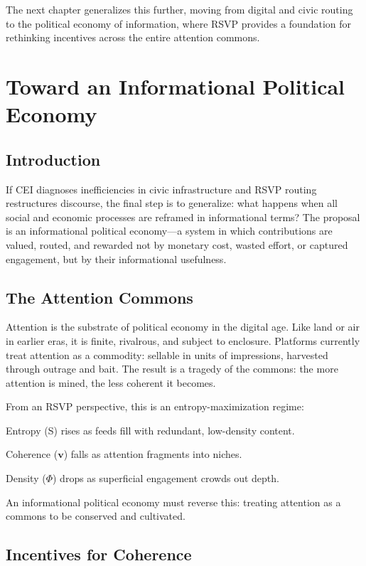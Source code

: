 \documentclass{book}
\begin{document}
The next chapter generalizes this further, moving from digital and civic routing to the political economy of information, where RSVP provides a foundation for rethinking incentives across the entire attention commons.

\chapter{Toward an Informational Political Economy}

\section{Introduction}

If CEI diagnoses inefficiencies in civic infrastructure and RSVP routing restructures discourse, the final step is to generalize: what happens when all social and economic processes are reframed in informational terms? The proposal is an informational political economy—a system in which contributions are valued, routed, and rewarded not by monetary cost, wasted effort, or captured engagement, but by their informational usefulness.

\section{The Attention Commons}

Attention is the substrate of political economy in the digital age. Like land or air in earlier eras, it is finite, rivalrous, and subject to enclosure. Platforms currently treat attention as a commodity: sellable in units of impressions, harvested through outrage and bait. The result is a tragedy of the commons: the more attention is mined, the less coherent it becomes.

From an RSVP perspective, this is an entropy-maximization regime:

Entropy (S) rises as feeds fill with redundant, low-density content.

Coherence (\(\mathbf{v}\)) falls as attention fragments into niches.

Density (\(\Phi\)) drops as superficial engagement crowds out depth.

An informational political economy must reverse this: treating attention as a commons to be conserved and cultivated.

\section{Incentives for Coherence}
\end{document}
